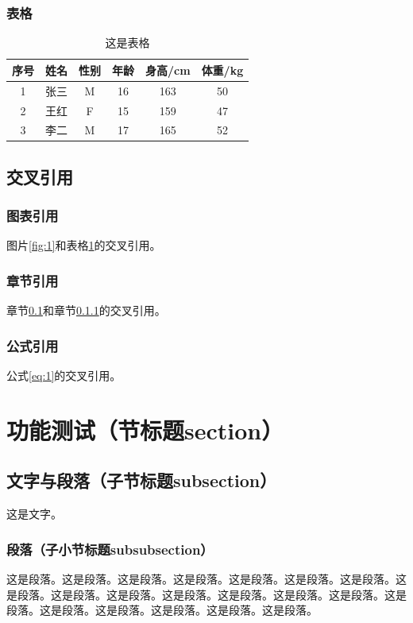 \documentclass[UTF8, zihao = -4, linespread = 1.335, heading = true, fontset = fandol]{ctexart}
\begin{document}
\subsubsection{表格}
\begin{table}[!htbp]
    \centering
    \caption{这是表格}
    \begin{tabular}{cccccc}
        \toprule
        序号 & 姓名 & 性别 & 年龄 & 身高/cm & 体重/kg \\
        \midrule
        1 & 张三 & M & 16 & 163 & 50 \\
        2 & 王红 & F & 15 & 159 & 47 \\
        3 & 李二 & M & 17 & 165 & 52 \\
        \bottomrule
    \end{tabular}
    \label{tab:1}
\end{table}
\subsection{交叉引用}\label{sec:1}
\subsubsection{图表引用}\label{sec:2}
图片\ref{fig:1}和表格\ref{tab:1}的交叉引用。
\subsubsection{章节引用}
章节\ref{sec:1}和章节\ref{sec:2}的交叉引用。
\subsubsection{公式引用}
公式\ref{eq:1}的交叉引用。
\section{功能测试（节标题section）}
\subsection{文字与段落（子节标题subsection）}
这是文字。
\subsubsection{段落（子小节标题subsubsection）}
这是段落。这是段落。这是段落。这是段落。这是段落。这是段落。这是段落。这是段落。这是段落。这是段落。这是段落。这是段落。这是段落。这是段落。这是段落。这是段落。这是段落。这是段落。这是段落。这是段落。
\end{document}
